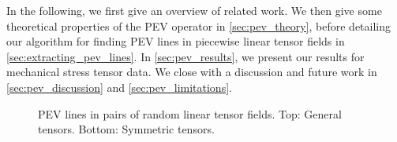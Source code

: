 %
In the following, we first give an overview of related work.
%
We then give some theoretical properties of the \ac{PEV} operator in
\cref{sec:pev_theory}, before detailing our algorithm for finding \ac{PEV} lines
in piecewise linear tensor fields in \cref{sec:extracting_pev_lines}.
%
In \cref{sec:pev_results}, we present our results for mechanical stress tensor
data.
%
We close with a discussion and future work in \cref{sec:pev_discussion} and
\cref{sec:pev_limitations}.
%
\begin{figure}[t]
    \centering
    
    \caption{\ac{PEV} lines in pairs of random linear tensor fields. Top:
             General tensors. Bottom: Symmetric tensors.}
    \label{fig:rand_lines}
\end{figure}
%
%
